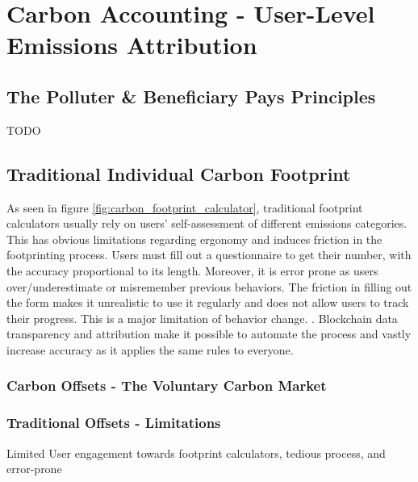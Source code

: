 \documentclass[11pt]{report}
\begin{document}
\section{Carbon Accounting - User-Level Emissions Attribution}

\subsection{The Polluter \& Beneficiary Pays Principles}

{\large{TODO}}

\subsection{Traditional Individual Carbon Footprint \label{se:traditional_footprint}}

As seen in figure \ref{fig:carbon_footprint_calculator}, traditional footprint calculators usually rely on users' self-assessment of different emissions categories. This has obvious limitations regarding ergonomy and induces friction in the footprinting process. Users must fill out a questionnaire to get their number, with the accuracy proportional to its length. Moreover, it is error prone as users over/underestimate or misremember previous behaviors. The friction in filling out the form makes it unrealistic to use it regularly and does not allow users to track their progress. This is a major limitation of behavior change. . Blockchain data transparency and attribution make it possible to automate the process and vastly increase accuracy as it applies the same rules to everyone.

\subsubsection{Carbon Offsets - The Voluntary Carbon Market}
\subsubsection{Traditional Offsets - Limitations}


Limited User engagement towards footprint calculators, tedious process, and error-prone

\end{document}
